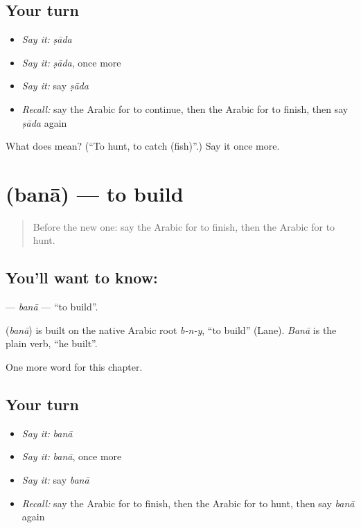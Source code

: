 \subsection*{Your turn}
\begin{itemize}
\raggedright
  \item \emph{Say it:} \emph{ṣāda}
  \item \emph{Say it:} \emph{ṣāda}, once more
  \item \emph{Say it:} say \emph{ṣāda}
  \item \emph{Recall:} say the Arabic for to continue, then the Arabic for to finish, then say \emph{ṣāda} again
\end{itemize}

\begin{tcolorbox}[breakable,colback=teal!4,colframe=teal!35!black,title={Before you move on}]
What does  mean? (\textquotedblleft{}To hunt, to catch (fish)\textquotedblright{}.) Say it once more.
\end{tcolorbox}
\section[\texorpdfstring{\ar{بنى} (banā)}{بنى (banā)}]{ (banā) — to build}

\label{lesson:AR-C166-bana}



\begin{quote}
Before the new one: say the Arabic for to finish, then the Arabic for to hunt.
\end{quote}

\subsection*{You'll want to know: }
\textbf{} — \emph{banā} — \textquotedblleft{}to build\textquotedblright{}.

\begin{cousinweb}
\textbf{} (\emph{banā}) is built on the native Arabic root \emph{b-n-y}, \textquotedblleft{}to build\textquotedblright{} (Lane). \emph{Banā} is the plain verb, \textquotedblleft{}he built\textquotedblright{}.
\end{cousinweb}

\begin{grammarlens}[title={What you've built}]
One more word for this chapter.
\end{grammarlens}

\subsection*{Your turn}
\begin{itemize}
\raggedright
  \item \emph{Say it:} \emph{banā}
  \item \emph{Say it:} \emph{banā}, once more
  \item \emph{Say it:} say \emph{banā}
  \item \emph{Recall:} say the Arabic for to finish, then the Arabic for to hunt, then say \emph{banā} again
\end{itemize}

